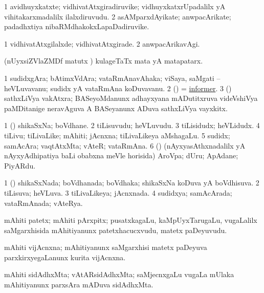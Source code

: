 \bentry
{}
\gl{\nA}
\bmng
\bnum
\num{1} avidhuyxkatxte; vidhivatAtxgiradiruvike; vidhuyxkatxrUpadalilx yA vihitakarxmadalilx ilalxdiruvudu. 
\num{2} asAMparxdAyikate; anwpacArikate; padadhxtiya nibaRMdhakokxLapaDadiruvike. 
\enum
\emng
\eentry

\bentry
{}
\gl{\kirxvi}
\bmng
\bnum
\num{1} vidhivatAtxgilalxde; vidhivatAtxgirade. 
\num{2} anwpacArikavAgi. 
\enum
\emng
\eentry

\bentry
{}
\gl{\nA}
\bmng
(nUyxsiZVlaZMDf matutx \AseTxrXV) kulageTaTx mata yA matapatarx. 
\emng
\eentry

\bentry
{}
\gl{\nA}
\bmng
\bnum
\num{1} sudidxgAra; bAtimxVdAra; vataRmAnavAhaka; viSaya, saMgati -- heVLuvavanu; sudidx yA vataRmAna koDuvavanu. 
\num{2} (\nAyxshA)  = \hyperlink{informer}{informer}. 
\num{3} (\BAshA) sathxLiVya vakAtxra; BASeyoMdanunx adhayxyana mADutitxruva videVshiVya paMDitanige neravAguva A BASeyanunx ADuva sathxLiVya vayxkitx. 
\enum
\emng
\eentry

\bentry
{}
\gl{\nA}
\bmng
\bnum
\num{1} (\gaparx) shikaSxNa; boVdhane. 
\num{2} tiLisuvudu; heVLuvudu. 
\num{3} tiLisidudx; heVLidudx. 
\num{4} tiLivu; tiLivaLike; mAhiti; jAcnxna; tiLivaLikeya aMshagaLu. 
\num{5} sudidx; samAcAra; vaqtAtxMta; vAteR; vataRmAna. 
\num{6} (\nAyxshA) (nAyxyasAthxnadalilx yA nAyxyAdhipatiya baLi obabxna meVle horisida) AroVpa; dUru; ApAdane; PiyARdu. 
\enum
\emng
\eentry

\bentry
{}
\gl{\gu}
\bmng
\bnum
\num{1} (\gaparx) shikaSxNada; boVdhanada; boVdhaka; shikaSxNa koDuva yA boVdhisuva. 
\num{2} tiLisuva; heVLuva. 
\num{3} tiLivaLikeya; jAcnxnada. 
\num{4} sudidxya; samAcArada; vataRmAnada; vAteRya. 
\enum
\emng
\eentry

\bentry
{}
\gl{\nA}
\bmng
mAhiti patetx; mAhiti pArxpitx; pusatxkagaLu, kaMpUyxTarugaLu, \mo vugaLalilx saMgarxhisida mAhitiyanunx patetxhacucxvudu, matetx paDeyuvudu. 
\emng
\eentry

\bentry
{}
\gl{\nA}
\bmng
mAhiti vijAcnxna; mAhitiyanunx saMgarxhisi matetx paDeyuva parxkirxyegaLanunx kurita vijAcnxna. 
\emng
\eentry

\bentry
{}
\gl{\nA}
\bmng
mAhiti sidAdhxMta; vAtARsidAdhxMta; saMjecnxgaLu \mo vugaLa mUlaka mAhitiyanunx parxsAra mADuva sidAdhxMta. 
\emng
\eentry

